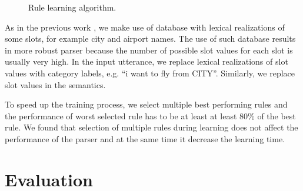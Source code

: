 \documentclass{article}
\begin{document}
\begin{figure}
\caption{Rule learning algorithm.}
\label{alg:tbl:learning}
\end{figure} 

As in the previous work \cite{zettlemoyer07,mairesse09,meza08b}, we make use of database with lexical realizations of some slots, for example city and airport names. The use of such database results in more robust parser because the number of possible slot values for each slot is usually very high. In the input utterance, we replace lexical realizations of slot values with category labels, e.g. ``i want to fly from CITY''. Similarly, we replace slot values in the semantics.

To speed up the training process, we select multiple best performing rules and the performance of worst selected rule has to be at least at least 80\% of the best rule. We found that selection of multiple rules during learning does not affect the performance of the parser and at the same time it decrease the learning time.


\section{Evaluation} \label{sec:evaluation}
\end{document}
